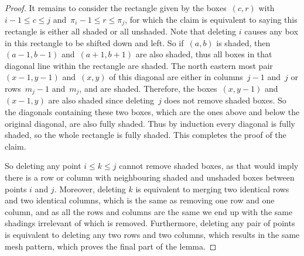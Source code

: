 \documentclass[preprint,11pt]{elsarticle}
\numberwithin{equation}{section}
\numberwithin{figure}{section}
\numberwithin{thm}{section}
\begin{document}
\begin{proof}
It remains to consider the rectangle given by the boxes~$(c,r)$ with~$i-1\le c\le j$ and~$\pi_i-1\le r\le\pi_j$,
 for which the claim is equivalent to saying this rectangle is either all shaded or all unshaded. 
 Note that deleting $i$ causes any box in this rectangle to be shifted down and left.
 So if~$(a,b)$ is shaded, then~$(a-1,b-1)$ and~$(a+1,b+1)$ are also shaded,
 thus all boxes in that diagonal line within the rectangle are shaded.
 The north eastern most pair~$(x-1,y-1)$ and~$(x,y)$ of this diagonal are either in columns~$j-1$ and~$j$ or rows~$m_j-1$ and~$m_j$, and are shaded.
 Therefore, the boxes~$(x,y-1)$ and~$(x-1,y)$ are also shaded since deleting~$j$ does not remove shaded boxes.
 So the diagonals containing these two boxes, which are the ones above and below the original diagonal, are also fully shaded.
 Thus by induction every diagonal is fully shaded, so the whole rectangle is fully shaded.
 This completes the proof of the claim.

So deleting any point 
 $i\le k\le j$ cannot remove shaded boxes, as that would imply there is a row or column with neighbouring shaded and unshaded boxes between points $i$ and $j$.
 Moreover, deleting $k$ is equivalent to merging two identical rows and two identical columns, which is the same as removing one row and one column,
 and as all the rows and columns are the same we end up with the same shadings
 irrelevant of which is removed. Furthermore, deleting any pair of points is equivalent to deleting any two rows and two columns,
 which results in the same mesh pattern, which proves the final part of the lemma.
\end{proof}
\end{document}
